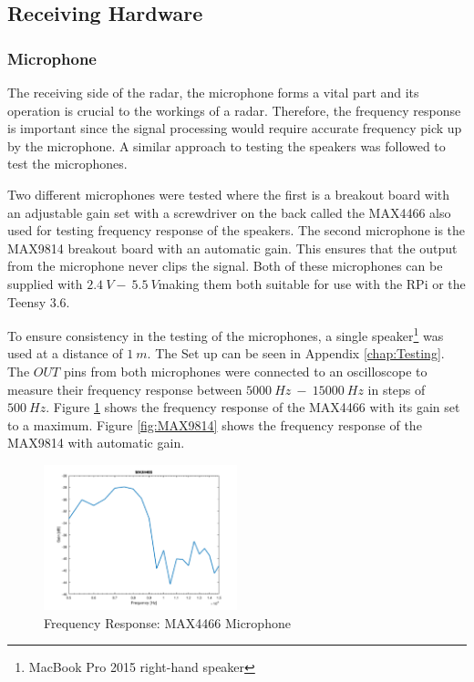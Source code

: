 \subsection{Receiving Hardware}
\subsubsection{Microphone}
The receiving side of the radar, the microphone forms a vital part and its operation is crucial to the workings of a radar. Therefore, the frequency response is important since the signal processing would require accurate frequency pick up by the microphone. A similar approach to testing the speakers was followed to test the microphones. 

Two different microphones were tested where the first is a breakout board with an adjustable gain set with a screwdriver on the back called the MAX4466 also used for testing frequency response of the speakers. The second microphone is the MAX9814 breakout board with an automatic gain. This ensures that the output from the microphone never clips the signal. Both of these microphones can be supplied with $2.4\ V -\ 5.5\ V$making them both suitable for use with the RPi or the Teensy 3.6. 

To ensure consistency in the testing of the microphones, a single speaker\footnote{MacBook Pro 2015 right-hand speaker} was used at a distance of $1\ m$. The Set up can be seen in Appendix \ref{chap:Testing}. The $OUT$ pins from both microphones were connected to an oscilloscope to measure their frequency response between $5000\ Hz\ -\ 15000\ Hz$ in steps of $500\ Hz$. Figure \ref{fig:MAX4466} shows the frequency response of the MAX4466 with its gain set to a maximum. Figure \ref{fig:MAX9814} shows the frequency response of the MAX9814 with automatic gain. 

\begin{figure}[h!]
    \centering
    \includegraphics[width = 0.5\textwidth]{images/MAX4466.pdf}
    \caption{Frequency Response: MAX4466 Microphone} \label{fig:MAX4466}
\end{figure}

